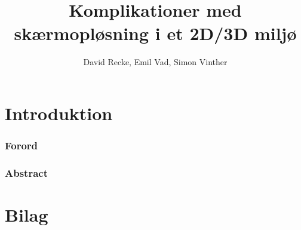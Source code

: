 \documentclass{report}
\author{David Recke, Emil Vad, Simon Vinther}
\title{Komplikationer med skærmopløsning i et 2D/3D miljø}
\begin{document}
		
	\chapter{Introduktion}
		\subsection{Forord}
		

	\subsection{Abstract}
		
	
	

	\clearpage	
	\chapter{Bilag}


	\appendix
	
\end{document}

